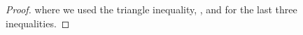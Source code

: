 \begin{proof}
    where we used the triangle inequality, , and  for the last three inequalities.
\end{proof}

